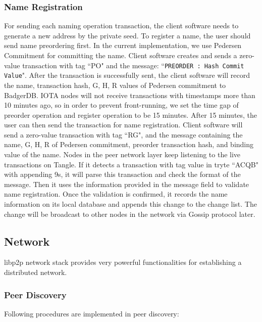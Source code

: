 \subsubsection{Name Registration} For sending each naming operation transaction, the client software needs to generate a new address by the private seed.
To register a name, the user should send name preordering first. In the current implementation, we use Pedersen Commitment \cite{pedersen1991non} for committing the name.
Client software creates and sends a zero-value transaction with tag ``PO" and the message: ``\texttt{PREORDER : \textlangle Hash Commit Value\textrangle}".
After the transaction is successfully sent, the client software will record the name, transaction hash, G, H, R values of Pedersen commitment to BadgerDB.
IOTA nodes will not receive transactions with timestamps more than 10 minutes ago, so in order to prevent front-running, we set the time gap of preorder operation and register operation to be 15 minutes.
After 15 minutes, the user can then send the transaction for name registration. Client software will send a zero-value transaction with tag ``RG", and the message containing the name, G, H, R of Pedersen commitment, preorder transaction hash, and binding value of the name.
Nodes in the peer network layer keep listening to the live transactions on Tangle. If it detects a transaction with tag value in tryte ``ACQB" with appending 9s, it will parse this transaction and check the format of the message.
Then it uses the information provided in the message field to validate name registration. Once the validation is confirmed, it records the name information on its local database and appends this change to the change list.
The change will be broadcast to other nodes in the network via Gossip protocol later.

\subsection{Network}
libp2p network stack provides very powerful functionalities for establishing a distributed network.

\subsubsection{Peer Discovery}
Following procedures are implemented in peer discovery:

